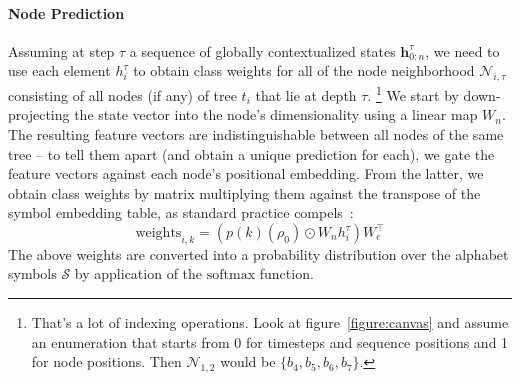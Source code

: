 \paragraph{Node Prediction} 
Assuming at step $\tau$ a sequence of globally contextualized states $\mathbf{h}^{\tau}_{0:n}$, we need to use each element $h^{\tau}_i$ to obtain class weights for all of the node neighborhood $\mathcal{N}_{i, \tau}$ consisting of all nodes (if any) of tree $t_i$ that lie at depth $\tau$.%
	\footnote{That's a lot of indexing operations. Look at figure~\ref{figure:canvas} and assume an enumeration that starts from 0 for timesteps and sequence positions and 1 for node positions. Then $\mathcal{N}_{1,2}$ would be $\{b_4, b_5, b_6, b_7 \}$.}
We start by down-projecting the state vector into the node's dimensionality using a linear map $W_n$.
The resulting feature vectors are indistinguishable between all nodes of the same tree -- to tell them apart (and obtain a unique prediction for each), we gate the feature vectors against each node's positional embedding.
From the latter, we obtain class weights by matrix multiplying them against the transpose of the symbol embedding table, as standard practice compels~\cite{press-wolf-2017-using}:
\begin{equation}
\mathrm{weights}_{i,k} = \left(p(k)(\rho_0) \odot W_n h^{\tau}_i\right) W_e^\top
\end{equation}
The above weights are converted into a probability distribution over the alphabet symbols $\mathcal{S}$ by application of the $\mathrm{softmax}$ function. 

